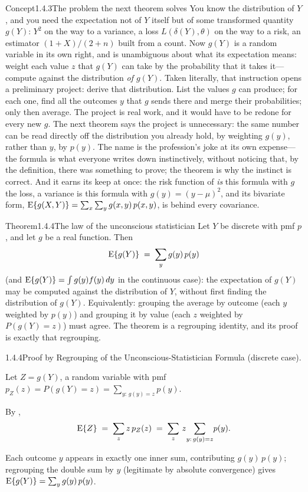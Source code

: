 \documentclass[main.tex]{subfiles}
\begin{document}
\begin{ObjL}{Concept}{1.4.3}{The problem the next theorem solves}
You know the distribution of $Y$, and you need the expectation not of $Y$ itself but of some
transformed quantity $g(Y)$: $Y^2$ on the way to a variance, a loss $L(\delta(Y),\theta)$ on
the way to a risk, an estimator $(1+X)/(2+n)$ built from a count. Now $g(Y)$ is a random
variable in its own right, and  is unambiguous about what its expectation means:
weight each value $z$ that $g(Y)$ can take by the probability that it takes it---compute
against the distribution \emph{of $g(Y)$}. Taken literally, that instruction opens a
preliminary project: derive that distribution. List the values $g$ can produce; for each one,
find all the outcomes $y$ that $g$ sends there and merge their probabilities; only then
average. The project is real work, and it would have to be redone for every new $g$. The next
theorem says the project is unnecessary: the same number can be read directly off the
distribution you already hold, by weighting $g(y)$, rather than $y$, by $p(y)$. The name is
the profession's joke at its own expense---the formula is what everyone writes down
instinctively, without noticing that, by the definition, there was something to prove; the
theorem is why the instinct is correct. And it earns its keep at once: the risk function of
 \emph{is} this formula with $g$ the loss, a variance is this formula with
$g(y)=(y-\mu)^2$, and its bivariate form,
$\mathrm{E}\{g(X,Y)\}=\sum_x\sum_y g(x,y)\,p(x,y)$, is behind every covariance.
\end{ObjL}

\begin{Obj}{Theorem}{1.4.4}{The law of the unconscious statistician}
Let $Y$ be discrete with pmf $p$, and let $g$ be a real function. Then
\[ \mathrm{E}\{g(Y)\} \;=\; \sum_{y} g(y)\,p(y) \]
(and $\mathrm{E}\{g(Y)\}=\int g(y)f(y)\,dy$ in the continuous case): the expectation of $g(Y)$ may be
computed against the distribution of $Y$, without first finding the distribution of $g(Y)$.
Equivalently: grouping the average by outcome (each $y$ weighted by $p(y)$) and grouping it by
value (each $z$ weighted by $P(g(Y)=z)$) must agree. The theorem is a regrouping identity, and
its proof is exactly that regrouping.
\end{Obj}
\begin{Prf}{1.4.4}{Proof by Regrouping of the Unconscious-Statistician Formula (discrete case).}{}
\item Let $Z=g(Y)$, a random variable with pmf $p_Z(z)=P(g(Y)=z)=\sum_{y:\,g(y)=z}p(y)$.
\item By ,
      \[ \mathrm{E}\{Z\} \;=\; \sum_z z\,p_Z(z) \;=\; \sum_z\, z \!\sum_{y:\,g(y)=z}\! p(y) . \]
\item Each outcome $y$ appears in exactly one inner sum, contributing $g(y)\,p(y)$; regrouping
      the double sum by $y$ (legitimate by absolute convergence) gives
      $\mathrm{E}\{g(Y)\}=\sum_y g(y)\,p(y)$.
\end{Prf}
\end{document}
